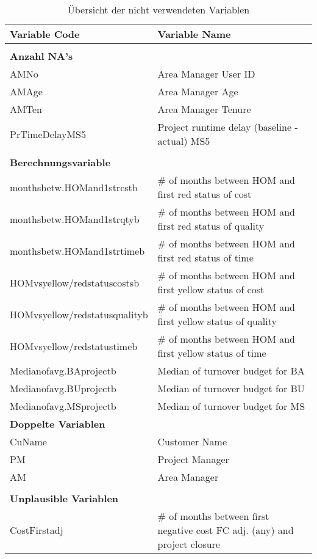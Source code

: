 \newpage
\begin{longtable}[ht]{p{} p{}}
	\caption{Übersicht der nicht verwendeten Variablen}\\
		\textbf{Variable Code} & \textbf{Variable Name} \\\hline\endhead
		 & \\
		\textbf{Anzahl NA's} &  \\\hline
		AMNo  & Area Manager User ID \\
		AMAge & Area Manager Age \\
		AMTen & Area Manager Tenure \\
		PrTimeDelayMS5 & Project runtime delay (baseline - actual) MS5 \\
		&\\
		\textbf{Berechnungsvariable} &  \\\hline
		monthsbetw.HOMand1strcstb & \# of months between HOM and first red status of cost \\
		monthsbetw.HOMand1strqtyb & \# of months between HOM and first red status of quality \\
		monthsbetw.HOMand1strtimeb & \# of months between HOM and first red status of time \\
		HOMvsyellow/redstatuscostsb & \# of months between HOM and first yellow status of cost \\
		HOMvsyellow/redstatusqualityb & \# of months between HOM and first yellow status of quality \\
		HOMvsyellow/redstatustimeb & \# of months between HOM and first yellow status of time \\
		Medianofavg.BAprojectb & Median of turnover budget for BA \\
		Medianofavg.BUprojectb & Median of turnover budget for BU \\
		Medianofavg.MSprojectb & Median of turnover budget for MS \\
		\textbf{Doppelte Variablen} &  \\\hline
		CuName & Customer Name \\
		PM    & Project Manager \\
		AM    & Area Manager \\
		&\\
		\textbf{Unplausible Variablen} &  \\\hline
		CostFirstadj & \# of months between first negative cost FC adj. (any) and project closure \\

\end{longtable}
